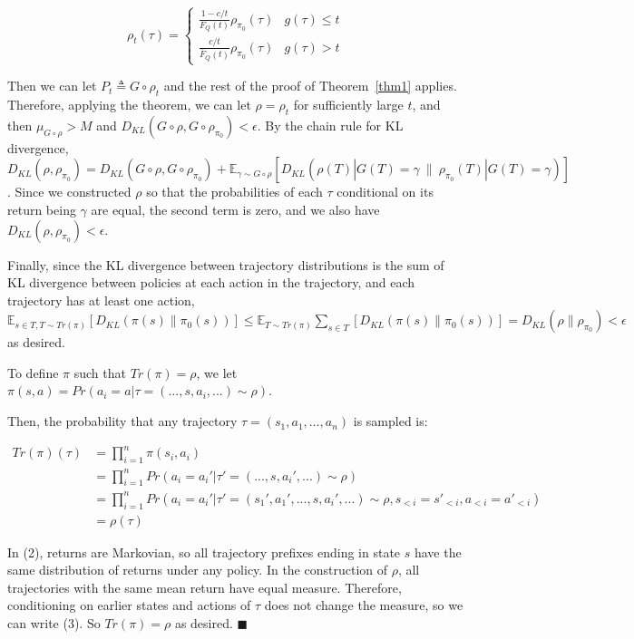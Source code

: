 \documentclass{article}
\begin{document}
\[
\rho_t(\tau) = \begin{cases} \frac{1 - c/t}{F_Q(t)} \rho_{\pi_0}(\tau) & g(\tau) \le t
\\ \frac{c/t}{\bar F_Q(t)}\rho_{\pi_0}(\tau) & g(\tau) > t
\end{cases}
\]

Then we can let \(P_t \triangleq G \circ \rho_t\) and the rest of the
proof of Theorem~\ref{thm1} applies. Therefore, applying the theorem, we can let
\(\rho = \rho_t\) for sufficiently large \(t\), and then
\(\mu_{G \circ \rho} > M\) and
\(D_{KL}(G \circ \rho, G \circ \rho_{\pi_0}) < \epsilon\). By the
chain rule for KL divergence,
\(D_{KL}(\rho, \rho_{\pi_0}) = D_{KL}(G\circ \rho, G \circ \rho_{\pi_0}) + \mathbb E_{\gamma \sim G\circ\rho}[D_{KL}(\rho(T) | G(T)=\gamma \ \|\ \rho_{\pi_0}(T) | G(T)=\gamma)]\).
Since we constructed \(\rho\) so that the probabilities of each \(\tau\)
conditional on its return being \(\gamma\) are equal, the second term is
zero, and we also have \(D_{KL}(\rho, \rho_{\pi_0}) < \epsilon\).

Finally, since the KL divergence between trajectory distributions is the
sum of KL divergence between policies at each action in the trajectory,
and each trajectory has at least one action,
\(\mathbb E_{s \in T, T\sim Tr(\pi)}[D_{KL}(\pi(s) \| \pi_0(s))] \le \mathbb E_{T\sim Tr(\pi)} \sum_{s \in T}[D_{KL}(\pi(s) \| \pi_0(s))] = D_{KL}(\rho \| \rho_{\pi_0}) < \epsilon\)
as desired.

To define \(\pi\) such that \(Tr(\pi) = \rho\), we let
\(\pi(s, a) = Pr(a_i = a | \tau = (..., s, a_i, ...) \sim \rho)\).

Then, the probability that any trajectory
\(\tau = (s_1, a_1, \dots, a_n)\) is sampled is:

\begin{align}
Tr(\pi)(\tau) &= \prod_{i=1}^n \pi(s_i, a_i) 
\\&= \prod_{i=1}^n Pr(a_i=a_i' | \tau' = (..., s, a_i', ...) \sim \rho)
\\&= \prod_{i=1}^n Pr(a_i = a_i' | \tau' = (s_1', a_1', ..., s, a_i', ...) \sim \rho, s_{<i} = s'_{<i}, a_{<i} = a'_{<i})
\\&= \rho(\tau)
\end{align}

In (2), returns are Markovian, so all trajectory prefixes ending in
state \(s\) have the same distribution of returns under any policy. In
the construction of \(\rho\), all trajectories with the same mean return
have equal measure. Therefore, conditioning on earlier states and
actions of \(\tau\) does not change the measure, so we can write (3). So
\(Tr(\pi)=\rho\) as desired. \(\blacksquare\)
\end{document}
